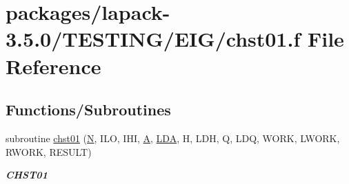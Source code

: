 \hypertarget{chst01_8f}{}\section{packages/lapack-\/3.5.0/\+T\+E\+S\+T\+I\+N\+G/\+E\+I\+G/chst01.f File Reference}
\label{chst01_8f}
\subsection*{Functions/\+Subroutines}
\begin{DoxyCompactItemize}
\item 
subroutine \hyperlink{group__complex__eig_ga30cd77400ba8f6d9e0cc2b316f549fb7}{chst01} (\hyperlink{polmisc_8c_a0240ac851181b84ac374872dc5434ee4}{N}, I\+L\+O, I\+H\+I, \hyperlink{classA}{A}, \hyperlink{example__user_8c_ae946da542ce0db94dced19b2ecefd1aa}{L\+D\+A}, H, L\+D\+H, Q, L\+D\+Q, W\+O\+R\+K, L\+W\+O\+R\+K, R\+W\+O\+R\+K, R\+E\+S\+U\+L\+T)
\begin{DoxyCompactList}\small\item\em {\bfseries C\+H\+S\+T01} \end{DoxyCompactList}\end{DoxyCompactItemize}
